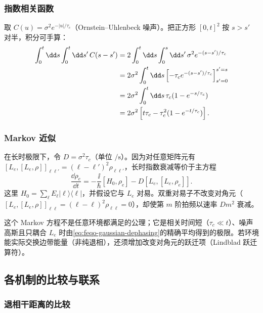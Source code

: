 \subsubsection{指数相关函数}

取 $C(u)=\sigma^2e^{-|u|/\tau_c}$（Ornstein--Uhlenbeck 噪声）。把正方形 $[0,t]^2$ 按 $s>s'$ 对半，积分可手算：
\begin{align}
\int_0^t\dd s\int_0^t\dd s'\,C(s-s')
&=2\int_0^t\dd s\int_0^s\dd s'\,\sigma^2 e^{-(s-s')/\tau_c}\notag\\
&=2\sigma^2\int_0^t\dd s\left[-\tau_c e^{-(s-s')/\tau_c}\right]_{s'=0}^{s'=s}\notag\\
&=2\sigma^2\int_0^t\dd s\,\tau_c(1-e^{-s/\tau_c})\notag\\
&=2\sigma^2\left[t\tau_c-\tau_c^2(1-e^{-t/\tau_c})\right].
\label{eq:feqo-ou-integral}
\end{align}

\subsubsection{Markov 近似}

在长时极限下，令 $D=\sigma^2\tau_c$（单位 $\si{\per\second}$）。因为对任意矩阵元有 $[L_e,[L_e,\rho]]_{\ell\ell'}=(\ell-\ell')^2\rho_{\ell\ell'}$，长时指数衰减等价于主方程
\begin{equation}
\frac{\dd\rho_e}{\dd t}
=-\frac{\ii}{\hbar}[H_0,\rho_e]
-D[L_e,[L_e,\rho_e]].
\label{eq:feqo-markov-dephasing}
\end{equation}
这里 $H_0=\sum_\ell E_\ell|\ell\rangle\langle\ell|$，并假设它与 $L_e$ 对易。双重对易子不改变对角元（$[L_e,[L_e,\rho]]_{\ell\ell}=(\ell-\ell)^2\rho_{\ell\ell}=0$），却使第 $m$ 阶拍频以速率 $Dm^2$ 衰减。

\begin{note}[适用范围]
这个 Markov 方程不是任意环境都满足的公理；它是相关时间短（$\tau_c\ll t$）、噪声高斯且只耦合 $L_e$ 时由\cref{eq:feqo-gaussian-dephasing}的精确平均得到的极限。若环境能实际交换边带能量（非纯退相），还须增加改变对角元的跃迁项（Lindblad 跃迁算符）。

\end{note}

\subsection{各机制的比较与联系}

\subsubsection{退相干距离的比较}

